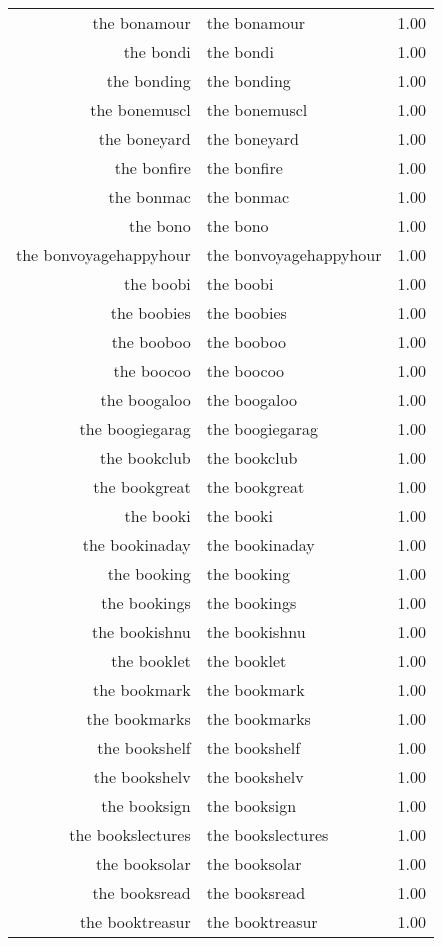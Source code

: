 \begin{table}[ht]
\begin{tabular}{rlr}
  the bonamour & the bonamour & 1.00 \\ 
  the bondi & the bondi & 1.00 \\ 
  the bonding & the bonding & 1.00 \\ 
  the bonemuscl & the bonemuscl & 1.00 \\ 
  the boneyard & the boneyard & 1.00 \\ 
  the bonfire & the bonfire & 1.00 \\ 
  the bonmac & the bonmac & 1.00 \\ 
  the bono & the bono & 1.00 \\ 
  the bonvoyagehappyhour & the bonvoyagehappyhour & 1.00 \\ 
  the boobi & the boobi & 1.00 \\ 
  the boobies & the boobies & 1.00 \\ 
  the booboo & the booboo & 1.00 \\ 
  the boocoo & the boocoo & 1.00 \\ 
  the boogaloo & the boogaloo & 1.00 \\ 
  the boogiegarag & the boogiegarag & 1.00 \\ 
  the bookclub & the bookclub & 1.00 \\ 
  the bookgreat & the bookgreat & 1.00 \\ 
  the booki & the booki & 1.00 \\ 
  the bookinaday & the bookinaday & 1.00 \\ 
  the booking & the booking & 1.00 \\ 
  the bookings & the bookings & 1.00 \\ 
  the bookishnu & the bookishnu & 1.00 \\ 
  the booklet & the booklet & 1.00 \\ 
  the bookmark & the bookmark & 1.00 \\ 
  the bookmarks & the bookmarks & 1.00 \\ 
  the bookshelf & the bookshelf & 1.00 \\ 
  the bookshelv & the bookshelv & 1.00 \\ 
  the booksign & the booksign & 1.00 \\ 
  the bookslectures & the bookslectures & 1.00 \\ 
  the booksolar & the booksolar & 1.00 \\ 
  the booksread & the booksread & 1.00 \\ 
  the booktreasur & the booktreasur & 1.00 \\ 

\end{tabular}
\end{table}
